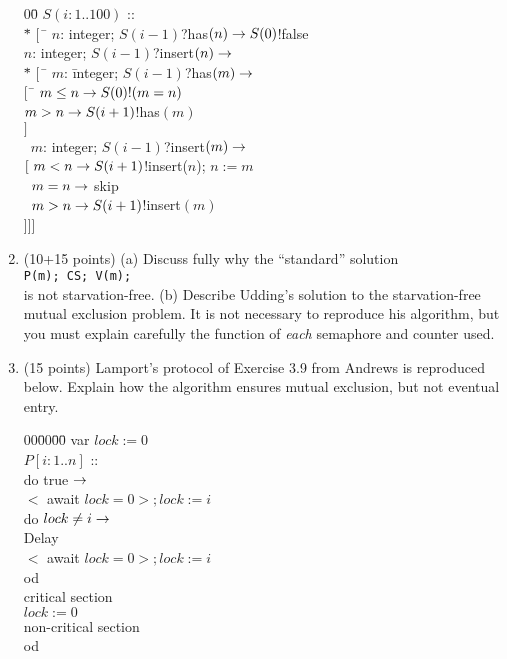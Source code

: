 \begin{enumerate}
\newpage
\begin{tabbing}
00\=\kill
$S(i: 1 .. 100)$ ::\+\\
$ *$\= $[\ $ \= $n$: integer; $S(i-1)$?has$(n) \rightarrow S(0)$!false\+\\
 \fat\> $n$: integer; $S(i-1)$?insert$(n) \rightarrow$\+\\
     $*$\= $[\ $ \= $m$: \= integer; $S(i-1)$?has$(m) \rightarrow$\+\+\\
       $[$\ \= $m \leq n \rightarrow S(0)!(m = n)$\\
       \fat \> $m > n \rightarrow S(i+1)$!has$(m)$\\
       $]$ \-\-\\
  \> \fat\ $m$: integer; $S(i-1)$?insert$(m) \rightarrow$\+\+\\
    $[\  m < n \rightarrow S(i+1)$!insert($n$); $n := m$\\
    \fat\ $m = n \rightarrow $ skip\\
    \fat\ $m > n \rightarrow S(i+1)$!insert$(m)$\-\-\-\\
]\>\>]\>]\\
\end{tabbing}

\item (10+15 points) (a) Discuss fully why the ``standard''
solution\\
{\tt P(m); CS; V(m);}\\
\noindent is not starvation-free.  (b) Describe
Udding's solution to the starvation-free mutual exclusion problem.  It
is not necessary to reproduce his algorithm, but you must explain
carefully the function of {\sl each} semaphore and counter used.

\item (15 points)
Lamport's protocol of Exercise 3.9 from Andrews is reproduced below.
Explain how the algorithm ensures mutual exclusion, but not eventual entry.

\begin{tabbing}
00\=00\=00\=\kill
var $lock := 0$\\
$P[i:1..n]$ ::\+\\
do true $\rightarrow$\+\\
  $<$ await $lock = 0 >; lock := i$\\
  do $lock \neq i \rightarrow$\+\\
    Delay\\
    $<$ await $lock = 0 >; lock := i$\\
  od\-\\
  critical section\\
  $lock := 0$\\
  non-critical section\-\\
od
\end{tabbing}


\end{enumerate}

